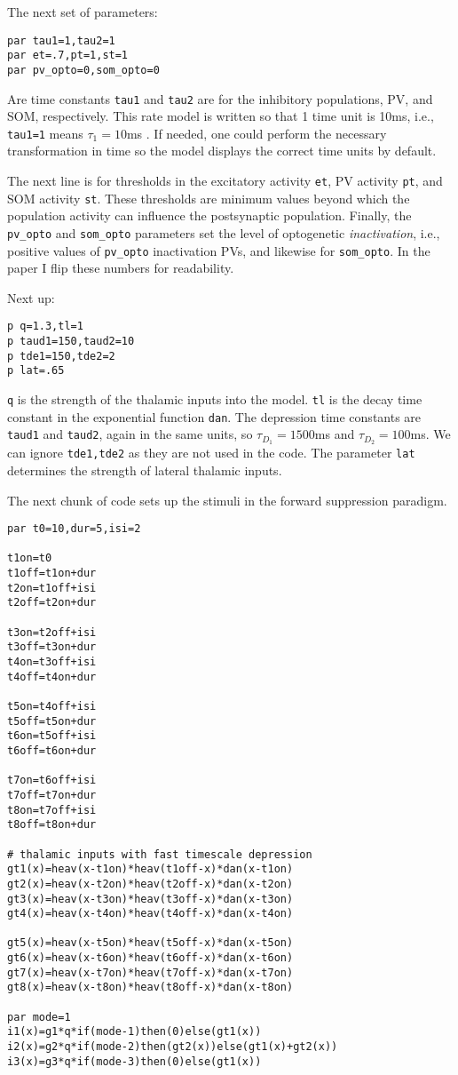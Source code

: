 \documentclass[a4paper,10pt]{article}
\newcommand{\y}[1]{{\texttt{#1}}}
\begin{document}
The next set of parameters:
\begin{verbatim}
par tau1=1,tau2=1
par et=.7,pt=1,st=1
par pv_opto=0,som_opto=0
\end{verbatim}
Are time constants \y{tau1} and \y{tau2} are for the inhibitory populations, PV, and SOM, respectively. This rate model is written so that 1 time unit is 10ms, i.e., \y{tau1=1} means $\tau_1 = 10$ms \cite{tsodyks1997neural,natan2015complementary}. If needed, one could perform the necessary transformation in time so the model displays the correct time units by default.

The next line is for thresholds in the excitatory activity \y{et}, PV activity \y{pt}, and SOM activity \y{st}. These thresholds are minimum values beyond which the population activity can influence the postsynaptic population. Finally, the \y{pv\_opto} and \y{som\_opto} parameters set the level of optogenetic \textit{inactivation}, i.e., positive values of \y{pv\_opto} inactivation PVs, and likewise for \y{som\_opto}. In the paper I flip these numbers for readability.

Next up:
\begin{verbatim}
p q=1.3,tl=1
p taud1=150,taud2=10
p tde1=150,tde2=2
p lat=.65 
\end{verbatim}
\y{q} is the strength of the thalamic inputs into the model. \y{tl} is the decay time constant in the exponential function \y{dan}. The depression time constants are \y{taud1} and \y{taud2}, again in the same units, so $\tau_{D_1} = 1500$ms and $\tau_{D_2} = 100$ms. We can ignore \y{tde1,tde2} as they are not used in the code. The parameter \y{lat} determines the strength of lateral thalamic inputs.

The next chunk of code sets up the stimuli in the forward suppression paradigm.
\begin{verbatim}
par t0=10,dur=5,isi=2

t1on=t0
t1off=t1on+dur
t2on=t1off+isi
t2off=t2on+dur

t3on=t2off+isi
t3off=t3on+dur
t4on=t3off+isi
t4off=t4on+dur

t5on=t4off+isi
t5off=t5on+dur
t6on=t5off+isi
t6off=t6on+dur

t7on=t6off+isi
t7off=t7on+dur
t8on=t7off+isi
t8off=t8on+dur

# thalamic inputs with fast timescale depression
gt1(x)=heav(x-t1on)*heav(t1off-x)*dan(x-t1on)
gt2(x)=heav(x-t2on)*heav(t2off-x)*dan(x-t2on)
gt3(x)=heav(x-t3on)*heav(t3off-x)*dan(x-t3on)
gt4(x)=heav(x-t4on)*heav(t4off-x)*dan(x-t4on)

gt5(x)=heav(x-t5on)*heav(t5off-x)*dan(x-t5on)
gt6(x)=heav(x-t6on)*heav(t6off-x)*dan(x-t6on)
gt7(x)=heav(x-t7on)*heav(t7off-x)*dan(x-t7on)
gt8(x)=heav(x-t8on)*heav(t8off-x)*dan(x-t8on)

par mode=1
i1(x)=g1*q*if(mode-1)then(0)else(gt1(x))
i2(x)=g2*q*if(mode-2)then(gt2(x))else(gt1(x)+gt2(x))
i3(x)=g3*q*if(mode-3)then(0)else(gt1(x))
\end{verbatim}
\end{document}
